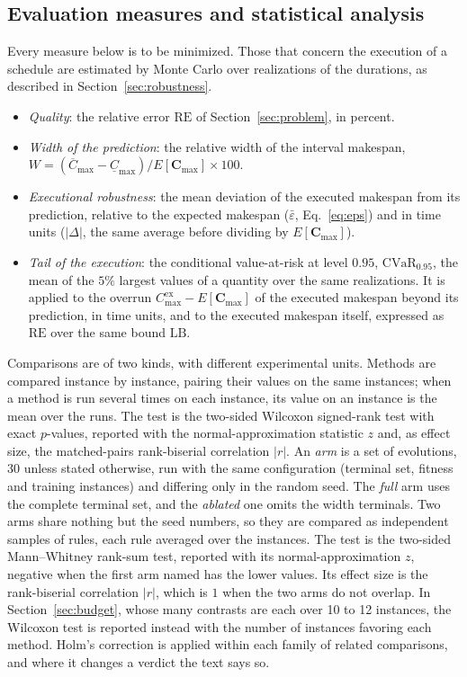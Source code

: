 \documentclass[review,authoryear,11pt]{elsarticle}
\newcommand{\RE}{\mathrm{RE}}
\newcommand{\LB}{\mathrm{LB}}
\begin{document}
\subsection{Evaluation measures and statistical analysis}
\label{sec:stats}
Every measure below is to be minimized. Those that concern the
execution of a schedule are estimated by Monte Carlo over realizations
of the durations, as described in Section~\ref{sec:robustness}.
\begin{itemize}
\item \emph{Quality}: the relative error $\RE$ of
  Section~\ref{sec:problem}, in percent.
\item \emph{Width of the prediction}: the relative width of the interval
  makespan,
  $W = (\overline{C}_{\max}-\underline{C}_{\max})/E[\mathbf{C}_{\max}]
  \times 100$.
\item \emph{Executional robustness}: the mean deviation of the executed
  makespan from its prediction, relative to the expected makespan
  ($\bar\varepsilon$, Eq.~\eqref{eq:eps}) and in time units
  ($|\Delta|$, the same average before dividing by
  $E[\mathbf{C}_{\max}]$).
\item \emph{Tail of the execution}: the conditional value-at-risk at
  level $0.95$, $\mathrm{CVaR}_{0.95}$, the mean of the $5\%$
  largest values of a quantity over the same realizations. It is applied
  to the overrun $C^{\mathrm{ex}}_{\max}-E[\mathbf{C}_{\max}]$ of the
  executed makespan beyond its prediction, in time units, and to the
  executed makespan itself, expressed as $\RE$ over the same bound
  $\LB$.
\end{itemize}

Comparisons are of two kinds, with different experimental units.
Methods are compared instance by instance, pairing their values on the
same instances; when a method is run several times on each instance,
its value on an instance is the mean over the runs. The test is the
two-sided Wilcoxon signed-rank test with exact $p$-values, reported with
the normal-approximation statistic $z$ and, as effect size, the
matched-pairs rank-biserial correlation $|r|$. An \emph{arm} is a set of
evolutions, 30 unless stated otherwise, run with the same configuration
(terminal set, fitness and training instances) and differing only in the
random seed. The \emph{full} arm uses the complete terminal set, and the
\emph{ablated} one omits the width terminals. Two arms share nothing but
the seed numbers, so they are compared as independent samples of rules,
each rule averaged over the instances. The test is the two-sided
Mann--Whitney rank-sum test, reported with its normal-approximation $z$,
negative when the first arm named has the lower values. Its effect size
is the rank-biserial correlation $|r|$, which is $1$ when the two arms
do not overlap. In
Section~\ref{sec:budget}, whose many contrasts are each over 10 to 12
instances, the Wilcoxon test is reported instead with the number of
instances favoring each method. Holm's correction is applied within each family
of related comparisons, and where it changes a verdict the text says
so.
\end{document}
